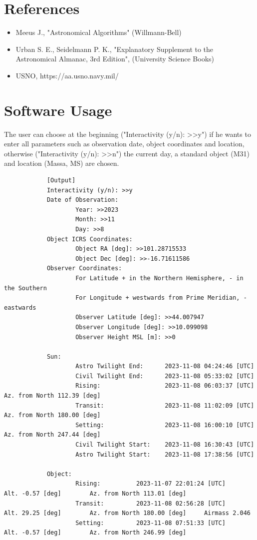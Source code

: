 \documentclass[a4paper]{article}
\begin{document}
	\section{References}
		\begin{itemize}
			\item Meeus J., "Astronomical Algorithms" (Willmann-Bell)
			\item Urban S. E., Seidelmann P. K., "Explanatory Supplement to the Astronomical Almanac, 3rd Edition", (University Science Books)
			\item USNO, https://aa.usno.navy.mil/
		\end{itemize}

	\newpage
	\section{Software Usage}
		The user can choose at the beginning ("Interactivity (y/n): >>y") if he wants to enter all parameters such as observation date, object coordinates and location, otherwise ("Interactivity (y/n): >>n") the current day, a standard object (M31) and location (Massa, MS) are chosen.\\
		
		\begin{scriptsize}
		\begin{verbatim}
			[Output]
			Interactivity (y/n): >>y
			Date of Observation:
			        Year: >>2023
			        Month: >>11
			        Day: >>8
			Object ICRS Coordinates:
			        Object RA [deg]: >>101.28715533
			        Object Dec [deg]: >>-16.71611586
			Observer Coordinates:
			        For Latitude + in the Northern Hemisphere, - in the Southern
			        For Longitude + westwards from Prime Meridian, - eastwards
			        Observer Latitude [deg]: >>44.007947
			        Observer Longitude [deg]: >>10.099098
			        Observer Height MSL [m]: >>0
			
			Sun:
			        Astro Twilight End:      2023-11-08 04:24:46 [UTC]
			        Civil Twilight End:      2023-11-08 05:33:02 [UTC]
			        Rising:                  2023-11-08 06:03:37 [UTC]       Az. from North 112.39 [deg]
			        Transit:                 2023-11-08 11:02:09 [UTC]       Az. from North 180.00 [deg]
			        Setting:                 2023-11-08 16:00:10 [UTC]       Az. from North 247.44 [deg]
			        Civil Twilight Start:    2023-11-08 16:30:43 [UTC]
			        Astro Twilight Start:    2023-11-08 17:38:56 [UTC]
			
			Object:
			        Rising:          2023-11-07 22:01:24 [UTC]       Alt. -0.57 [deg]        Az. from North 113.01 [deg]
			        Transit:         2023-11-08 02:56:28 [UTC]       Alt. 29.25 [deg]        Az. from North 180.00 [deg]     Airmass 2.046
			        Setting:         2023-11-08 07:51:33 [UTC]       Alt. -0.57 [deg]        Az. from North 246.99 [deg]
		\end{verbatim}
		\end{scriptsize}
		
\end{document}
